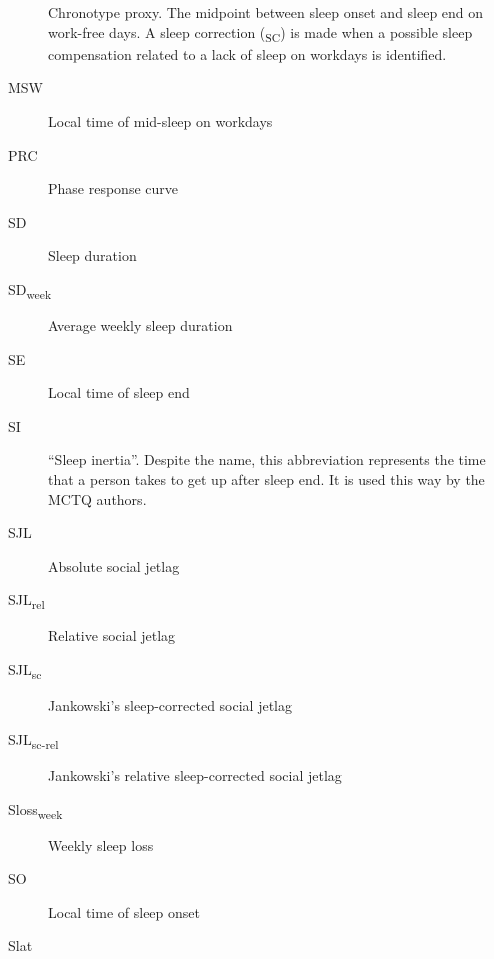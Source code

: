 \documentclass[
  12pt,
  a4paper,
  oneside]{tesesusp}
\begin{document}
\begin{siglas}
\begin{description}
Chronotype proxy. The midpoint between sleep onset and sleep end on
work-free days. A sleep correction (\textsubscript{SC}) is made when a
possible sleep compensation related to a lack of sleep on workdays is
identified.
\item[MSW]
\hspace{20cm}

Local time of mid-sleep on workdays
\item[PRC]
\hspace{20cm}

Phase response curve
\item[SD]
\hspace{20cm}

Sleep duration
\item[SD\textsubscript{week}]
\hspace{20cm}

Average weekly sleep duration
\item[SE]
\hspace{20cm}

Local time of sleep end
\item[SI]
\hspace{20cm}

``Sleep inertia''. Despite the name, this abbreviation represents the
time that a person takes to get up after sleep end. It is used this way
by the MCTQ authors.
\item[SJL]
\hspace{20cm}

Absolute social jetlag
\item[SJL\textsubscript{rel}]
\hspace{20cm}

Relative social jetlag
\item[SJL\textsubscript{sc}]
\hspace{20cm}

Jankowski's sleep-corrected social jetlag
\item[SJL\textsubscript{sc-rel}]
\hspace{20cm}

Jankowski's relative sleep-corrected social jetlag
\item[Sloss\textsubscript{week}]
\hspace{20cm}

Weekly sleep loss
\item[SO]
\hspace{20cm}

Local time of sleep onset
\item[Slat]
\hspace{20cm}


\end{description}
\end{siglas}
\end{document}
